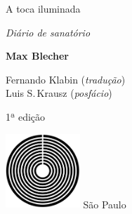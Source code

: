




\begingroup\thispagestyle{empty}\vspace*{.05\textheight} 

              \formular
              
              \LARGE\noindent
              A toca iluminada

              \smallskip
                      
              \large\noindent\textit{Diário de sanatório}

              \bigskip  
              
              \Large\noindent\textbf{Max Blecher}
              

              \vfill
              {\fontsize{30}{40}%
              \small\noindent 
              Fernando Klabin (\textit{tradução})\vspace{-0.3em}\\
              \noindent
              Luis S.\,Krausz (\textit{posfácio})}
              
              \bigskip

              \noindent
              {\fontsize{30}{40}%
              \small\noindent 1ª edição}
                      
              \vfill\noindent\includegraphics[width=0.21\textwidth]{logo}
              \break{} 
              \smallskip
              {\fontsize{30}{40}%
              \scriptsize\noindent São Paulo\quad\the\year}

\endgroup
\pagebreak
